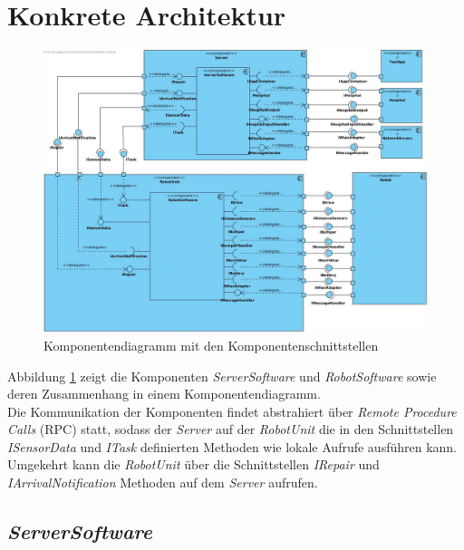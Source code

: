 \section{Konkrete Architektur}

\begin{figure}[H]
\centering
\includegraphics[height=1\linewidth, angle=90]{img/2-Entwurf-4-KonkreteArchitektur}
\caption{Komponentendiagramm mit den Komponentenschnittstellen}
\label{KomponentendiagrammKonkret}
\end{figure}


Abbildung \ref{KomponentendiagrammKonkret} zeigt die Komponenten \emph{ServerSoftware} und \emph{RobotSoftware} sowie deren Zusammenhang in einem Komponentendiagramm. \\ Die Kommunikation der Komponenten findet abstrahiert über \emph{Remote Procedure Calls} (RPC) statt, sodass der \emph{Server} auf der \emph{RobotUnit} die in den Schnittstellen \emph{ISensorData} und \emph{ITask} definierten Methoden wie lokale Aufrufe ausführen kann. Umgekehrt kann die \emph{RobotUnit} über die Schnittstellen \emph{IRepair} und \emph{IArrivalNotification} Methoden auf dem \emph{Server} aufrufen.

\subsection{\textit{ServerSoftware}}

